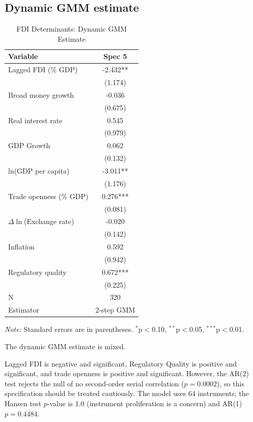 \subsection{Dynamic GMM estimate}
\label{subsec:dynamic-gmm-estimate}

\begin{table}[htbp]
\centering
\setlength{\tabcolsep}{3pt}
\renewcommand{\arraystretch}{0.95}
\caption{FDI Determinants: Dynamic GMM Estimate}
\label{tab:fresh-gmm}
\begin{tabular}{lc}
\hline\hline
Variable & Spec 5 \\
\hline
Lagged FDI (\% GDP) & -2.432** \\
 & (1.174) \\
Broad money growth & -0.036 \\
 & (0.675) \\
Real interest rate & 0.545 \\
 & (0.979) \\
GDP Growth & 0.062 \\
 & (0.132) \\
ln(GDP per capita) & -3.011** \\
 & (1.176) \\
Trade openness (\% GDP) & 0.276*** \\
 & (0.081) \\
$\Delta \ln$(Exchange rate) & -0.020 \\
 & (0.142) \\
Inflation & 0.592 \\
 & (0.942) \\
Regulatory quality & 0.672*** \\
 & (0.225) \\
N & 320 \\
Estimator & 2-step GMM \\
\hline\hline
\end{tabular}%
\par\noindent\textit{Note:} Standard errors are in parentheses. $^{*}$p$<$0.10, $^{**}$p$<$0.05, $^{***}$p$<$0.01.
\end{table}

The dynamic GMM estimate is mixed.

Lagged FDI is negative and significant, Regulatory Quality is positive and significant, and trade openness is positive and significant. However, the AR(2) test rejects the null of no second-order serial correlation ($p = 0.0002$), so this specification should be treated cautiously. The model uses 64 instruments; the Hansen test $p$-value is 1.0 (instrument proliferation is a concern) and AR(1) $p = 0.4484$.

